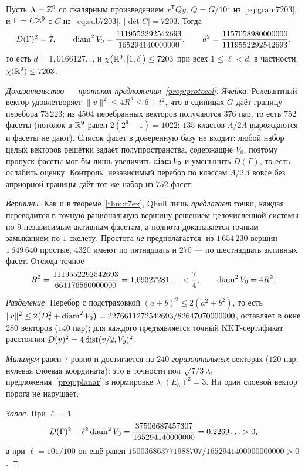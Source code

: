 \begin{keybox}
\begin{theorem}\label{thm:r9ex}
Пусть $\Lambda=\mathbb{Z}^9$ со скалярным произведением $x^{\mathsf T}Qy$,
$Q=G/10^4$ из~\eqref{eq:gram7203}, и $\Gamma=C\mathbb{Z}^9$ с $C$
из~\eqref{eq:sub7203}, $|\det C|=7203$. Тогда
\[
D(\Gamma)^2=7,\qquad
\operatorname{diam}^2 V_0=\frac{1119552292542693}{165294140000000},\qquad
d^2=\frac{1157058980000000}{1119552292542693},
\]
то есть $d=1{,}0166127\ldots$, и $\chi\bigl(\mathbb{R}^9,[1,\ell]\bigr)\le7203$ при
всех $1\le\ell<d$; в частности, $\chi(\mathbb{R}^9)\le7203$.
\end{theorem}
\end{keybox}

\begin{proof}[Доказательство --- протокол предложения~\ref{prop:protocol}]
\emph{Ячейка.} Релевантный вектор удовлетворяет $\|v\|^2\le4R^2\le6+t^2$, что
в единицах $G$ даёт границу перебора $73\,223$; из $4504$ перебранных векторов
получаются $376$ пар, то есть $752$ фасеты (потолок в $\mathbb{R}^9$ равен
$2(2^9-1)=1022$: $135$ классов $\Lambda/2\Lambda$ вырождаются и фасеты не
дают). Список фасет в доверенную базу не входит: любой набор целых векторов
решётки задаёт полупространства, содержащие $V_0$, поэтому пропуск фасеты мог
бы лишь увеличить $\operatorname{diam} V_0$ и уменьшить $D(\Gamma)$, то есть ослабить
оценку. Контроль: независимый перебор по классам $\Lambda/2\Lambda$ вовсе без
априорной границы даёт тот же набор из $752$ фасет.

\emph{Вершины.} Как и в теореме~\ref{thm:r7ex}, Qhull лишь \emph{предлагает}
точки, каждая переводится в точную рациональную вершину решением
целочисленной системы по $9$ независимым активным фасетам, а полнота
доказывается точным замыканием по $1$-скелету. Простота \emph{не}
предполагается: из $1\,654\,230$ вершин $1\,649\,640$ простые, $4320$ имеют по
пятнадцать и $270$ --- по шестнадцать активных фасет. Отсюда точное
\[
R^2=\frac{1119552292542693}{661176560000000}=1{,}69327281\ldots<\frac74,
\qquad \operatorname{diam}^2V_0=4R^2 .
\]

\emph{Разделение.} Перебор с подстраховкой $(a+b)^2\le2(a^2+b^2)$, то есть
$\|v\|^2\le2\bigl(D_{*}^2+\operatorname{diam}^2V_0\bigr)=2276611272542693/82647070000000$,
оставляет в окне $280$ векторов ($140$ пар); для каждого предъявляется точный
KKT-сертификат расстояния $D(v)^2=4\operatorname{dist}(v/2,V_0)^2$.

\emph{Минимум} равен $7$ ровно и достигается на $240$ \emph{горизонтальных}
векторах ($120$ пар, нулевая слоевая координата): это в точности пол
$\sqrt{7/3}\,\lambda_1$ предложения~\ref{prop:planar} в нормировке
$\lambda_1(E_8)^2=3$. Ни один слоевой вектор порога не нарушает.

\emph{Запас.} При $\ell=1$
\[
D(\Gamma)^2-\ell^2\operatorname{diam}^2 V_0=\frac{37506687457307}{165294140000000}
=0{,}2269\ldots>0,
\]
а при $\ell=101/100$ он ещё равен
$150036863771988707/1652941400000000000>0$.
\qedhere
\end{proof}

